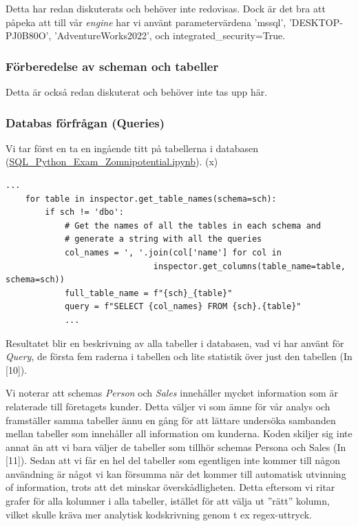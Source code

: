 \documentclass[10pt]{article}
\begin{document}
Detta har redan diskuterats och behöver inte redovisas. Dock är det bra att påpeka att till vår \emph{engine} har vi använt parametervärdena 'mssql', 'DESKTOP-PJ0B80O', 'AdventureWorks2022', och integrated\_security=True.

\subsubsection{Förberedelse av scheman och tabeller}
 
 Detta är också redan diskuterat och behöver inte tas upp här.

\subsubsection{Databas förfrågan (Queries)}

Vi tar först en ta en ingående titt på tabellerna i databasen (\href{https://github.com/Zomnipotential/EC\_SQL\_Python\_Quiz/blob/main/SQL\_Python\_Exam\_Zomnipotential.ipynb}{SQL\_Python\_Exam\_Zomnipotential.ipynb}).
\if(x)
\begin{lstlisting}
...
    for table in inspector.get_table_names(schema=sch):
        if sch != 'dbo':
            # Get the names of all the tables in each schema and
            # generate a string with all the queries
            col_names = ', '.join(col['name'] for col in 
            			      inspector.get_columns(table_name=table, schema=sch))
            full_table_name = f"{sch}_{table}"
            query = f"SELECT {col_names} FROM {sch}.{table}"
            ...
\end{lstlisting}
\fi
Resultatet blir en beskrivning av alla tabeller i databasen, vad vi har använt för \emph{Query}, de första fem raderna i tabellen och lite statistik över just den tabellen (In [10]).

Vi noterar att schemas \emph{Person} och \emph{Sales} innehåller mycket information som är relaterade till företagets kunder. Detta väljer vi som ämne för vår analys och framställer samma tabeller ännu en gång för att lättare undersöka sambanden mellan tabeller som innehåller all information om kunderna. Koden skiljer sig inte annat än att vi bara väljer de tabeller som tillhör schemas Persona och Sales (In [11]). Sedan att vi får en hel del tabeller som egentligen inte kommer till någon användning är något vi kan försumma när det kommer till automatisk utvinning of information, trots att det minskar överskådligheten. Detta eftersom vi ritar grafer för alla kolumner i alla tabeller, istället för att välja ut ''rätt'' kolumn, vilket skulle kräva mer analytisk kodskrivning genom t ex regex-uttryck.
\end{document}
